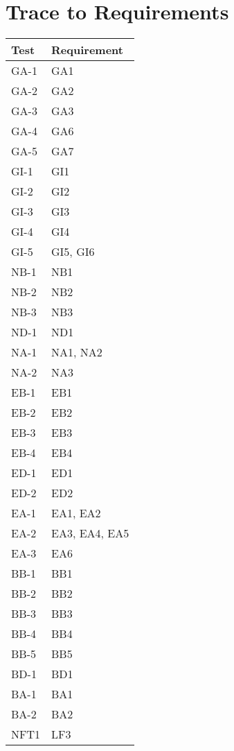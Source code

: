 \documentclass[12pt, titlepage]{article}
\begin{document}
\section{Trace to Requirements}

\begin{longtable}{| p{} | p{} |}
  \hline
  Test & Requirement\\
  \hline
  GA-1 & GA1\\
  \hline
  GA-2 & GA2\\
  \hline
  GA-3 & GA3\\
  \hline
  GA-4 & GA6\\
  \hline
  GA-5 & GA7\\
  \hline
  GI-1 & GI1\\
  \hline
  GI-2 & GI2\\
  \hline
  GI-3 & GI3\\
  \hline
  GI-4 & GI4\\
  \hline
  GI-5 & GI5, GI6\\
  \hline
  NB-1 & NB1\\
  \hline
  NB-2 & NB2\\
  \hline
  NB-3 & NB3\\
  \hline
  ND-1 & ND1\\
  \hline
  NA-1 & NA1, NA2\\
  \hline
  NA-2 & NA3\\
  \hline
  EB-1 & EB1\\
  \hline
  EB-2 & EB2\\
  \hline
  EB-3 & EB3\\
  \hline
  EB-4 & EB4\\
  \hline
  ED-1 & ED1\\
  \hline
  ED-2 & ED2\\
  \hline
  EA-1 & EA1, EA2\\
  \hline
  EA-2 & EA3, EA4, EA5\\
  \hline
  EA-3 & EA6\\
  \hline
  BB-1 & BB1\\
  \hline
  BB-2 & BB2\\
  \hline
  BB-3 & BB3\\
  \hline
  BB-4 & BB4\\
  \hline
  BB-5 & BB5\\
  \hline
  BD-1 & BD1\\
  \hline
  BA-1 & BA1\\
  \hline
  BA-2 & BA2\\
  \hline
  NFT1 & LF3\\

\end{longtable}
\end{document}
